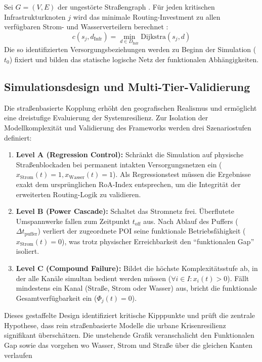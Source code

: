 Sei $G = (V, E)$ der ungestörte Straßengraph \cite{cite: 88}. Für jeden kritischen Infrastrukturknoten $j$ wird das minimale Routing-Investment zu allen verfügbaren Strom- und Wasserverteilern berechnet \cite{cite: 96}:
\begin{equation}
    c(s_j, d_{\text{Infr}}) = \min_{d \in D_{\text{Infr}}} \text{Dijkstra}(s_j, d)
\end{equation}
Die so identifizierten Versorgungsbeziehungen werden zu Beginn der Simulation ($t_0$) fixiert und bilden das statische logische Netz der funktionalen Abhängigkeiten.

\subsection{Simulationsdesign und Multi-Tier-Validierung}
Die straßenbasierte Kopplung erhöht den geografischen Realismus und ermöglicht eine dreistufige Evaluierung der Systemresilienz. Zur Isolation der Modellkomplexität und Validierung des Frameworks werden drei Szenariostufen definiert:

\begin{enumerate}
    \item \textbf{Level A (Regression Control):} Schränkt die Simulation auf physische Straßenblockaden bei permanent intakten Versorgungsnetzen ein ($x_{\text{Strom}}(t) = 1, x_{\text{Wasser}}(t) = 1$). Als Regressionstest müssen die Ergebnisse exakt dem ursprünglichen RoA-Index entsprechen, um die Integrität der erweiterten Routing-Logik zu validieren.

    \item \textbf{Level B (Power Cascade):} Schaltet das Stromnetz frei. Überflutete Umspannwerke fallen zum Zeitpunkt $t_{\text{off}}$ aus. Nach Ablauf des Puffers ($\Delta t_{\text{puffer}}$) verliert der zugeordnete POI seine funktionale Betriebsfähigkeit ($x_{\text{Strom}}(t) = 0$), was trotz physischer Erreichbarkeit den ``funktionalen Gap'' isoliert.

    \item \textbf{Level C (Compound Failure):} Bildet die höchste Komplexitätsstufe ab, in der alle Kanäle simultan bedient werden müssen ($\forall i \in I: x_i(t) > 0$). Fällt mindestens ein Kanal (Straße, Strom oder Wasser) aus, bricht die funktionale Gesamtverfügbarkeit ein ($\Phi_j(t) = 0$).
\end{enumerate}

\noindent
Dieses gestaffelte Design identifiziert kritische Kipppunkte und prüft die zentrale Hypothese, dass rein straßenbasierte Modelle die urbane Krisenresilienz signifikant überschätzen. Die unstehende Grafik veranschalicht den Funktionalen Gap sowie das vorgehen wo Wasser, Strom und Straße über die gleichen Kanten verlaufen

